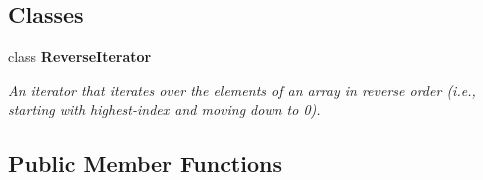 \subsection*{Classes}
\begin{DoxyCompactItemize}
\item 
class {\bfseries Reverse\+Iterator}
\begin{DoxyCompactList}\small\item\em An iterator that iterates over the elements of an array in reverse order (i.\+e., starting with highest-\/index and moving down to 0). \end{DoxyCompactList}\end{DoxyCompactItemize}
\subsection*{Public Member Functions}
